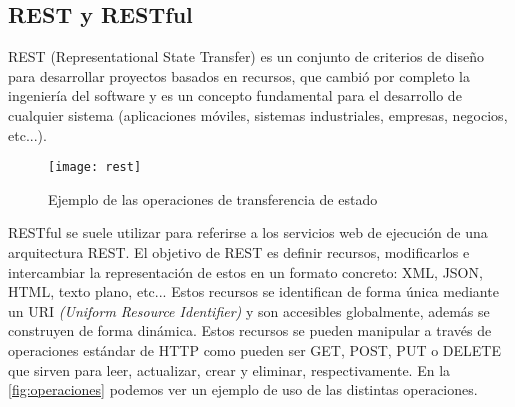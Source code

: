 \subsection{REST y RESTful}
REST (Representational State Transfer) es un conjunto de criterios de diseño para desarrollar proyectos basados en recursos, que cambió por completo la ingeniería del software y es un concepto fundamental para el desarrollo de cualquier sistema (aplicaciones móviles, sistemas industriales, empresas, negocios, etc...).
\begin{figure}[h!]
	\centering
	\texttt{[image: rest]}
	\caption{Ejemplo de las operaciones de transferencia de estado}
	\label{fig:operaciones}
\end{figure} RESTful se suele utilizar para referirse a los servicios web de ejecución de una arquitectura REST.
El objetivo de REST es definir recursos, modificarlos e intercambiar la representación de estos en un formato concreto: XML, JSON, HTML, texto plano, etc... Estos recursos se identifican de forma única mediante un URI \textit{(Uniform Resource Identifier)} y son accesibles globalmente, además se construyen de forma dinámica. Estos recursos se pueden manipular a través de operaciones estándar de HTTP como pueden ser GET, POST, PUT o DELETE que sirven para leer, actualizar, crear y eliminar, respectivamente.
En la \autoref{fig:operaciones} podemos ver un ejemplo de uso de las distintas operaciones.

